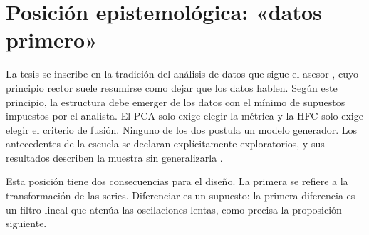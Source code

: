 \section{Posición epistemológica: «datos primero»}
\label{sec:epistemologia}

La tesis se inscribe en la tradición del análisis de datos que sigue el asesor
\parencite{benzecri_1973}, cuyo principio rector suele resumirse como dejar que los datos
hablen. Según este principio, la estructura debe
emerger de los datos con el mínimo de supuestos impuestos por el analista. El PCA solo exige
elegir la métrica y la HFC solo exige elegir el criterio de fusión. Ninguno de los dos postula un
modelo generador. Los antecedentes de la escuela se declaran explícitamente exploratorios, y sus
resultados describen la muestra sin generalizarla
\parencite{camiz_maulucci_roig_2010,camiz_et_al_2020}.

Esta posición tiene dos consecuencias para el diseño. La primera se refiere a la transformación
de las series. Diferenciar es un supuesto: la primera diferencia es un filtro lineal que atenúa
las oscilaciones lentas, como precisa la proposición siguiente.


